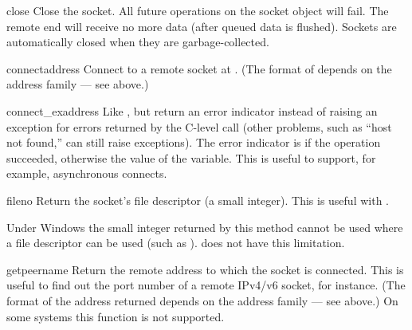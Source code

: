 \begin{methoddesc}[socket]{close}{}
Close the socket.  All future operations on the socket object will fail.
The remote end will receive no more data (after queued data is flushed).
Sockets are automatically closed when they are garbage-collected.
\end{methoddesc}

\begin{methoddesc}[socket]{connect}{address}
Connect to a remote socket at .
(The format of  depends on the address family --- see
above.)  
\end{methoddesc}

\begin{methoddesc}[socket]{connect_ex}{address}
Like , but return an error indicator
instead of raising an exception for errors returned by the C-level
 call (other problems, such as ``host not found,''
can still raise exceptions).  The error indicator is  if the
operation succeeded, otherwise the value of the 
variable.  This is useful to support, for example, asynchronous connects.
\end{methoddesc}

\begin{methoddesc}[socket]{fileno}{}
Return the socket's file descriptor (a small integer).  This is useful
with .

Under Windows the small integer returned by this method cannot be used where
a file descriptor can be used (such as ).  \UNIX{} does
not have this limitation.
\end{methoddesc}

\begin{methoddesc}[socket]{getpeername}{}
Return the remote address to which the socket is connected.  This is
useful to find out the port number of a remote IPv4/v6 socket, for instance.
(The format of the address returned depends on the address family ---
see above.)  On some systems this function is not supported.
\end{methoddesc}


